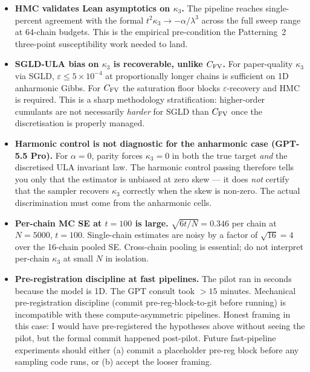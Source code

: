 \documentclass[11pt]{article}
\begin{document}
\begin{itemize}[noitemsep,leftmargin=*]
  \item \textbf{HMC validates Lean asymptotics on $\kappa_3$.} The
    pipeline reaches single-percent agreement with the formal
    $t^2 \kappa_3 \to -\alpha/\lambda^3$ across the full sweep range
    at 64-chain budgets. This is the empirical pre-condition the
    Patterning~2 three-point susceptibility work needed to land.

  \item \textbf{SGLD-ULA bias on $\kappa_3$ is recoverable, unlike
    $C_{\rm FV}$.} For paper-quality $\kappa_3$ via SGLD,
    $\varepsilon \leq 5{\times}10^{-4}$ at proportionally
    longer chains is sufficient on 1D anharmonic Gibbs. For
    $C_{\rm FV}$ the saturation floor blocks $\varepsilon$-recovery
    and HMC is required. This is a sharp methodology stratification:
    higher-order cumulants are not necessarily \emph{harder} for
    SGLD than $C_{\rm FV}$ once the discretisation is properly
    managed.

  \item \textbf{Harmonic control is not diagnostic for the
    anharmonic case (GPT-5.5 Pro).} For $\alpha = 0$, parity forces
    $\kappa_3 = 0$ in both the true target \emph{and} the
    discretised ULA invariant law. The harmonic control passing
    therefore tells you only that the estimator is unbiased at zero
    skew --- it does \emph{not} certify that the sampler recovers
    $\kappa_3$ correctly when the skew is non-zero. The actual
    discrimination must come from the anharmonic cells.

  \item \textbf{Per-chain MC SE at $t = 100$ is large.}
    $\sqrt{6 t / N} = 0.346$ per chain at $N = 5000$, $t = 100$.
    Single-chain estimates are noisy by a factor of $\sqrt{16} = 4$
    over the 16-chain pooled SE. Cross-chain pooling is essential;
    do not interpret per-chain $\kappa_3$ at small $N$ in
    isolation.

  \item \textbf{Pre-registration discipline at fast pipelines.}
    The pilot ran in seconds because the model is 1D. The GPT
    consult took $> 15$ minutes. Mechanical pre-registration
    discipline (commit pre-reg-block-to-git before running) is
    incompatible with these compute-asymmetric pipelines. Honest
    framing in this case: I would have pre-registered the
    hypotheses above without seeing the pilot, but the formal
    commit happened post-pilot. Future fast-pipeline experiments
    should either (a) commit a placeholder pre-reg block before
    any sampling code runs, or (b) accept the looser framing.


\end{itemize}
\end{document}
